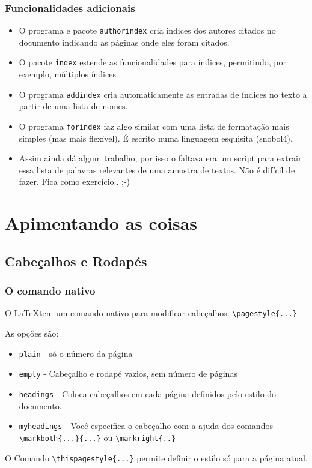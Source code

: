 \documentclass{beamer}
\newcommand{\pacote}[1]{\texttt{\textcolor[rgb]{0.3,0.6,0}{#1}}}
\begin{document}
\begin{frame}[fragile]
\frametitle{Funcionalidades adicionais}

	\begin{itemize}
	 \item O programa e pacote \pacote{authorindex} cria índices dos autores citados no documento indicando as páginas onde eles foram citados.
	\item O pacote \pacote{index} estende as funcionalidades para índices, permitindo, por exemplo, múltiplos índices 
	\item O programa \pacote{addindex} cria automaticamente as entradas de índices no texto a partir de uma lista de nomes.
	\item O programa \pacote{forindex} faz algo similar com uma lista de formatação mais simples (mas mais flexível). É escrito numa linguagem esquisita (snobol4).
	\item Assim ainda dá algum trabalho, por isso o faltava era um script para extrair essa lista de palavras relevantes de uma amostra de textos. Não é difícil de fazer. Fica como exercício.. ;-)
	\end{itemize}


\end{frame}

\section{Apimentando as coisas}


\subsection{Cabeçalhos e Rodapés}

\begin{frame}[fragile]
\frametitle{O comando nativo}

O \LaTeX tem um comando nativo para modificar cabeçalhos: \verb!\pagestyle{...}!

As opções são: 

\begin{itemize}
 \item \texttt{plain} - só o número da página
\item \texttt{empty} - Cabeçalho e rodapé vazios, sem número de páginas
\item \texttt{headings} - Coloca cabeçalhos em cada página definidos pelo estilo do documento.
\item \texttt{myheadings} - Você especifica o cabeçalho com a ajuda dos comandos \verb!\markboth{...}{...}! ou \verb!\markright{..}!
\end{itemize}
\vspace{15pt}
O Comando \verb!\thispagestyle{...}! permite definir o estilo só para a página atual.

\end{frame}
\end{document}
